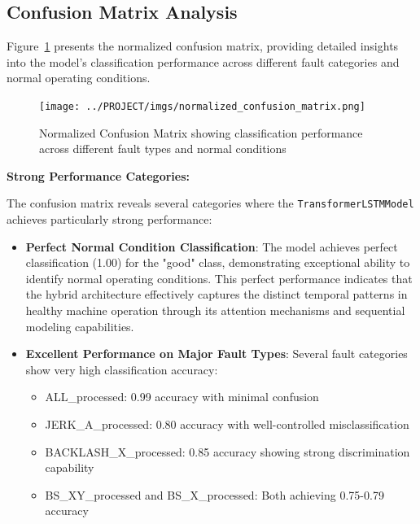 \subsection{Confusion Matrix Analysis}
\label{subsec:confusion_matrix_analysis}

Figure~\ref{fig:normalized_confusion_matrix} presents the normalized confusion matrix, providing detailed insights into the model's classification performance across different fault categories and normal operating conditions.

\begin{figure}[ht]
\centering
\texttt{[image: ../PROJECT/imgs/normalized\_confusion\_matrix.png]}
\caption{Normalized Confusion Matrix showing classification performance across different fault types and normal conditions}
\label{fig:normalized_confusion_matrix}
\end{figure}

\textbf{Strong Performance Categories:}

The confusion matrix reveals several categories where the \texttt{TransformerLSTMModel} achieves particularly strong performance:

\begin{itemize}
    \item \textbf{Perfect Normal Condition Classification}: The model achieves perfect classification (1.00) for the "good" class, demonstrating exceptional ability to identify normal operating conditions. This perfect performance indicates that the hybrid architecture effectively captures the distinct temporal patterns in healthy machine operation through its attention mechanisms and sequential modeling capabilities.
    
    \item \textbf{Excellent Performance on Major Fault Types}: Several fault categories show very high classification accuracy:
    \begin{itemize}
        \item ALL\_processed: 0.99 accuracy with minimal confusion
        \item JERK\_A\_processed: 0.80 accuracy with well-controlled misclassification
        \item BACKLASH\_X\_processed: 0.85 accuracy showing strong discrimination capability
        \item BS\_XY\_processed and BS\_X\_processed: Both achieving 0.75-0.79 accuracy
    \end{itemize}
\end{itemize}

